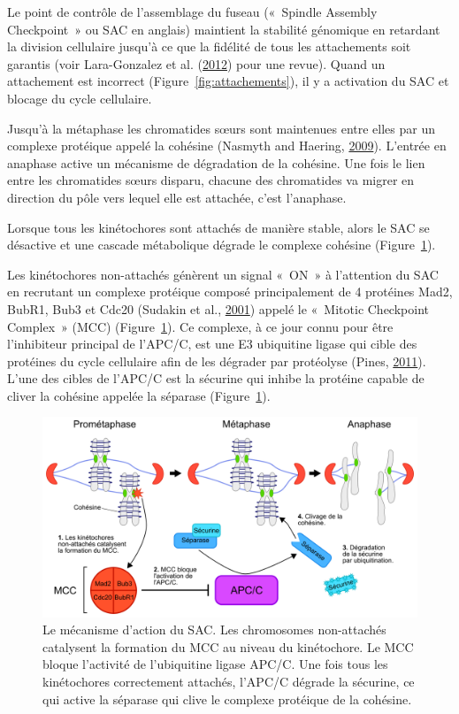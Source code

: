 \documentclass[12pt,a4paper,twoside,openright]{book}
\begin{document}
Le point de contrôle de l'assemblage du fuseau («~Spindle Assembly
Checkpoint~» ou SAC en anglais) maintient la stabilité génomique en
retardant la division cellulaire jusqu'à ce que la fidélité de tous les
attachements soit garantis (voir Lara-Gonzalez et al.
(\protect\hyperlink{ref-Lara-Gonzalez2012}{2012}) pour une revue). Quand
un attachement est incorrect (Figure~\ref{fig:attachements}), il y a
activation du SAC et blocage du cycle cellulaire.

Jusqu'à la métaphase les chromatides sœurs sont maintenues entre elles
par un complexe protéique appelé la cohésine (Nasmyth and Haering,
\protect\hyperlink{ref-Nasmyth2009}{2009}). L'entrée en anaphase active
un mécanisme de dégradation de la cohésine. Une fois le lien entre les
chromatides sœurs disparu, chacune des chromatides va migrer en
direction du pôle vers lequel elle est attachée, c'est l'anaphase.

Lorsque tous les kinétochores sont attachés de manière stable, alors le
SAC se désactive et une cascade métabolique dégrade le complexe cohésine
(Figure~\ref{fig:sac}).

Les kinétochores non-attachés génèrent un signal «~ON~» à l'attention du
SAC en recrutant un complexe protéique composé principalement de 4
protéines Mad2, BubR1, Bub3 et Cdc20 (Sudakin et al.,
\protect\hyperlink{ref-Sudakin2001}{2001}) appelé le «~Mitotic
Checkpoint Complex~» (MCC) (Figure~\ref{fig:sac}). Ce complexe, à ce
jour connu pour être l'inhibiteur principal de l'APC/C, est une E3
ubiquitine ligase qui cible des protéines du cycle cellulaire afin de
les dégrader par protéolyse (Pines,
\protect\hyperlink{ref-Pines2011}{2011}). L'une des cibles de l'APC/C
est la sécurine qui inhibe la protéine capable de cliver la cohésine
appelée la séparase (Figure~\ref{fig:sac}).

\begin{figure}[htbp]
\centering
\includegraphics{figures/intro/sac.png}
\caption{\label{fig:sac}Le mécanisme d'action du SAC. Les chromosomes
non-attachés catalysent la formation du MCC au niveau du kinétochore. Le
MCC bloque l'activité de l'ubiquitine ligase APC/C. Une fois tous les
kinétochores correctement attachés, l'APC/C dégrade la sécurine, ce qui
active la séparase qui clive le complexe protéique de la cohésine.}
\end{figure}
\end{document}
